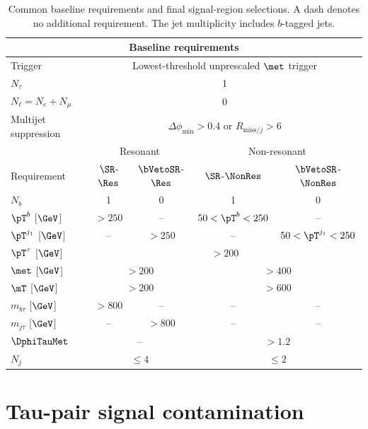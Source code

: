 \begin{table}[htbp]
    \centering
    \small
    \caption{Common baseline requirements and final signal-region selections. A dash denotes no additional requirement. The jet multiplicity includes $b$-tagged jets.}
    \label{tab:ch7_signal_regions}
    \begin{tabular}{lcccc}
        \toprule
        \multicolumn{5}{c}{Baseline requirements} \\
        \midrule
        Trigger & \multicolumn{4}{c}{Lowest-threshold unprescaled $\met$ trigger} \\
        $N_\tau$ & \multicolumn{4}{c}{1} \\
        $N_\ell=N_e+N_\mu$ & \multicolumn{4}{c}{0} \\
        Multijet suppression & \multicolumn{4}{c}{$\Delta\phi_{\min}>0.4$ or $R_{\mathrm{miss}/j}>6$} \\
        \midrule
        & \multicolumn{2}{c}{Resonant} & \multicolumn{2}{c}{Non-resonant} \\
        Requirement & $\SR$-$\Res$ & $\bVetoSR$-$\Res$ & $\SR$-$\NonRes$ & $\bVetoSR$-$\NonRes$ \\
        \midrule
        $N_b$ & 1 & 0 & 1 & 0 \\
        $\pT^b$ [$\GeV$] & $>250$ & -- & $50<\pT^b<250$ & -- \\
        $\pT^{j_1}$ [$\GeV$] & -- & $>250$ & -- & $50<\pT^{j_1}<250$ \\
        $\pT^\tau$ [$\GeV$] & \multicolumn{4}{c}{$>200$} \\
        $\met$ [$\GeV$] & \multicolumn{2}{c}{$>200$} & \multicolumn{2}{c}{$>400$} \\
        $\mT$ [$\GeV$] & \multicolumn{2}{c}{$>200$} & \multicolumn{2}{c}{$>600$} \\
        $m_{b\tau}$ [$\GeV$] & $>800$ & -- & -- & -- \\
        $m_{j\tau}$ [$\GeV$] & -- & $>800$ & -- & -- \\
        $\DphiTauMet$ & \multicolumn{2}{c}{--} & \multicolumn{2}{c}{$>1.2$} \\
        $N_j$ & \multicolumn{2}{c}{$\leq4$} & \multicolumn{2}{c}{$\leq2$} \\
        \bottomrule
    \end{tabular}
\end{table}

\clearpage
\section{Tau-pair signal contamination}
\label{sec:ch7_tautau_contamination}

